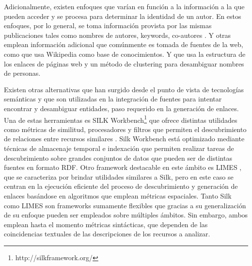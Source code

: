 \documentclass[conference]{IEEEtran}
\begin{document}
Adicionalmente, existen enfoques que varían en función a la información a la que pueden acceder y se procesa para determinar la identidad de un autor. En estos enfoques, por lo general, se toma información provista por las mismas publicaciones tales como nombres de autores, keywords, co-autores \cite{shoaib2015improving}. Y otras emplean información adicional que comúnmente es tomada de fuentes de la web, como \cite{bunescu2006using} que usa Wikipedia como base de conocimientos. Y \cite{bekkerman2005disambiguating}  que  usa la estructura de los enlaces de páginas web y un método de clustering para desambiguar nombres de personas. 

Existen otras alternativas que han surgido desde el punto de vista de tecnologías semánticas y que son utilizadas en la integración de fuentes para intentar encontrar y desambiguar entidades, paso requerido en la generación de enlaces. Una de estas herramientas es SILK Workbench\footnote{http://silkframework.org/} que ofrece distintas utilidades como métricas de similitud, procesadores y filtros que permiten el descubrimiento de relaciones entre recursos similares \cite{volz2009silk}. Silk Workbench está optimizado mediante técnicas de almacenaje temporal e indexación  que permiten realizar tareas de descubrimiento sobre grandes conjuntos de datos que pueden  ser de distintas fuentes en formato RDF. Otro framework destacable en este ámbito es LIMES \cite{ngomo2011limes}, que se caracteriza por brindar utilidades similares a Silk, pero en este caso se centran en la ejecución eficiente del proceso de descubrimiento y generación de enlaces basándose en algoritmos que emplean métricas espaciales. Tanto  Silk como LIMES son frameworks sumamente flexibles que gracias a su generalización de su enfoque pueden ser empleados sobre múltiples ámbitos. Sin embargo, ambos emplean hasta el momento métricas sintácticas, que dependen de las coincidencias textuales de las descripciones de los recursos a analizar.
\end{document}
